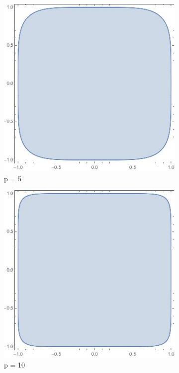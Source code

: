 \documentclass[12pt,letterpaper,reqno]{amsart}
\begin{document}
\begin{enumerate}[1.]
\begin{enumerate}[(a)]
\begin{figure}[h]
\centering
\begin{subfigure}{.33\textwidth}
  \centering
  \includegraphics[width=.8\linewidth]{./norm-5.jpeg}
  \caption*{p = 5}
\end{subfigure}%
\begin{subfigure}{.33\textwidth}
  \centering
  \includegraphics[width=.8\linewidth]{./norm-10.jpeg}
  \caption*{p = 10}
\end{subfigure}
\begin{subfigure}{.33\textwidth}
  \centering

\end{subfigure}
\end{figure}
\end{enumerate}
\end{enumerate}
\end{document}
